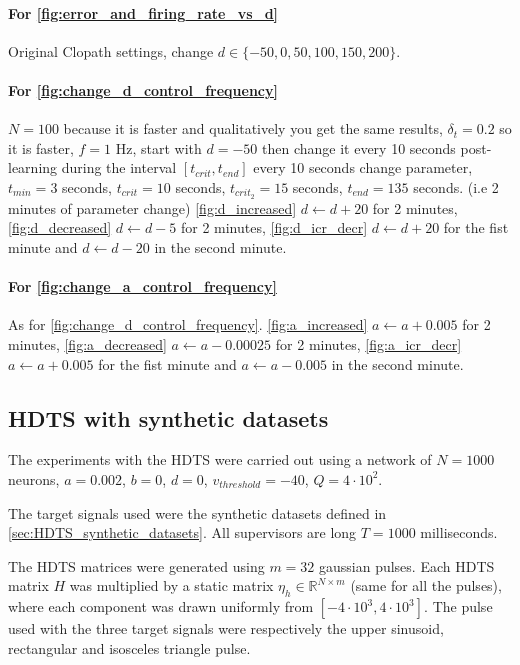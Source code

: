 \documentclass[10pt,a4paper, final]{report} %
\begin{document}

\paragraph{For \autoref{fig:error_and_firing_rate_vs_d}}
Original Clopath settings, change $d \in \{-50, 0, 50, 100, 150, 200 \}$.

\paragraph{For \autoref{fig:change_d_control_frequency}}
$N = 100$ because it is faster and qualitatively you get the same results,
$\delta_t = 0.2$ so it is faster,
$f = 1$ Hz,
start with $d = -50$ then change it every 10 seconds post-learning during the interval $[t_{crit}, t_{end}]$
every 10 seconds change parameter,
$t_{min} = 3$ seconds, $t_{crit} = 10$ seconds, $t_{crit_2} = 15$ seconds, $t_{end} = 135$ seconds. 
(i.e 2 minutes of parameter change)
\autoref{fig:d_increased} $d \leftarrow d + 20$ for 2 minutes,
\autoref{fig:d_decreased} $d \leftarrow d - 5$ for 2 minutes,
\autoref{fig:d_icr_decr}  $d \leftarrow d + 20$ for the fist minute and $d \leftarrow d - 20$ in the second minute.

\paragraph{For \autoref{fig:change_a_control_frequency}}
As for \autoref{fig:change_d_control_frequency}. 
\autoref{fig:a_increased} $a \leftarrow a + 0.005$ for 2 minutes,
\autoref{fig:a_decreased} $a \leftarrow a - 0.00025$ for 2 minutes,
\autoref{fig:a_icr_decr}  $a \leftarrow a + 0.005$ for the fist minute and $a \leftarrow a - 0.005$ in the second minute.

\subsection{HDTS with synthetic datasets} 
The experiments with the HDTS were carried out using a network of $N = 1000$ neurons, $a = 0.002$, $b = 0$, $d = 0$, $v_{threshold} = -40$, $Q = 4 \cdot 10^2$. 

The target signals used were the synthetic datasets defined in \autoref{sec:HDTS_synthetic_datasets}. All supervisors are long $T=1000$ milliseconds.

The HDTS matrices were generated using $m=32$ gaussian pulses. Each HDTS matrix $H$ was multiplied by a static matrix $\eta_{h} \in \mathbb{R}^{N \times m}$ (same for all the pulses), where each component was drawn uniformly from $[-4 \cdot 10^3, 4 \cdot 10^3]$. The pulse used with the three target signals were respectively the upper sinusoid, rectangular and isosceles triangle pulse.
\end{document}

